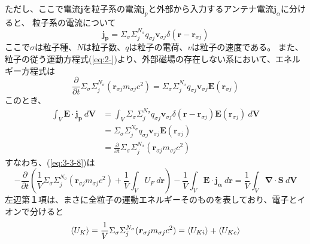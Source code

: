 \documentclass[a4paper,11pt,titlepage]{jsarticle}
\begin{document}
  ただし、ここで電流$\bm{j}$を粒子系の電流$\bm{j}_p$と外部から入力するアンテナ電流$\bm{j}_\alpha$に分けると、
  粒子系の電流について
  \begin{equation}
    \label{eq:3-3-9}
    \bm{j_p} = \Sigma_\sigma \Sigma_j^{N_\sigma} q_{\sigma j} \bm{v}_{\sigma j}\delta(\bm{r}-\bm{r}_{\sigma j})
  \end{equation}
  ここで$\sigma$は粒子種、$N$は粒子数、$q$は粒子の電荷、$v$は粒子の速度である。
  また、粒子の従う運動方程式(\ref{eq:2-})より、外部磁場の存在しない系において、エネルギー方程式は
  \begin{equation}
    \label{eq:3-3-10}
      \frac{\partial}{\partial t} \Sigma_\sigma \Sigma_j^{N_\sigma} ( \bm{r}_{\sigma j} m_{\sigma j} c^2 ) 
      = \Sigma_\sigma \Sigma_j^{N_\sigma} q_{\sigma j} \bm{v}_{\sigma j} \bm{E}(\bm{r}_{\sigma j})
  \end{equation}
  このとき、
  \begin{align}
    \label{eq:3-3-11}
    \nonumber
    \int_V \bm{E} \cdot \bm{j_p} \: d\bm{V}  &= \int_V \Sigma_\sigma \Sigma_j^{N_\sigma} q_{\sigma j} \bm{v}_{\sigma j}\delta(\bm{r}-\bm{r}_{\sigma j}) \bm{E}(\bm{r}_{\sigma j})\: d\bm{V} \\
    \nonumber
          &= \Sigma_\sigma \Sigma_j^{N_\sigma} q_{\sigma j} \bm{v}_{\sigma j} \bm{E}(\bm{r}_{\sigma j})  \\
    &= \frac{\partial}{\partial t} \Sigma_\sigma \Sigma_j^{N_\sigma} ( \bm{r}_{\sigma j} m_{\sigma j} c^2 )
  \end{align}
  すなわち、(\ref{eq:3-3-8})は
  \begin{equation}
    \label{eq:3-3-12}
    - \frac{\partial}{\partial t} \left( \frac{1}{V} \Sigma_\sigma \Sigma_j^{N_\sigma} ( \bm{r}_{\sigma j} m_{\sigma j} c^2 ) 
    + \frac{1}{V} \int_V U_F \: d\bm{r}  \right) - \frac{1}{V} \int_V \bm{E} \cdot \bm{j_\alpha} \: d\bm{r} 
    = \frac{1}{V} \int_V \bm{\nabla} \cdot \bm{S} \: d\bm{V}
  \end{equation}
  左辺第１項は、まさに全粒子の運動エネルギーそのものを表しており、電子とイオンで分けると
  \begin{equation}
    \label{eq:3-3-13}
      \braket{U_K} = \frac{1}{V} \Sigma_\sigma \Sigma_j^{N_\sigma} ( \bm{r}_{\sigma j} m_{\sigma j} c^2 )
      = \braket{U_{Ki}} + \braket{U_{Ke}} 
  \end{equation}
\end{document}
